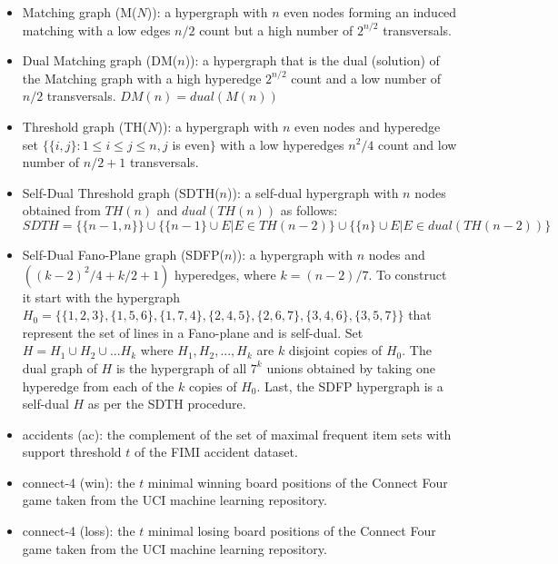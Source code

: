 \begin{itemize}
    \item Matching graph (M($N$)): a hypergraph with $n$ even nodes forming an induced matching with a low edges $n/2$ count but a high number of $2^{n/2}$ transversals.
    
     \scalebox{.75}{} 
     
    
    \item Dual Matching graph (DM($n$)): a hypergraph that is the dual (solution) of the Matching graph with a high hyperedge $2^{n/2}$ count and a low number of $n/2$ transversals. $DM(n) = dual(M(n))$
    
     \scalebox{.75}{}
    
    \item Threshold graph (TH($N$)): a hypergraph with $n$ even nodes and hyperedge set $\{\{i,j\}:1 \leq i \le j \leq n, j$ is even$\}$ with a low hyperedges ${n^2}/4$ count and low number of  $n/2 +1$ transversals.
    
     \scalebox{.75}{}   
    
    \item Self-Dual Threshold graph (SDTH($n$)): a self-dual hypergraph with $n$ nodes obtained from $TH(n)$ and $dual(TH(n))$ as follows: $$SDTH = \{ \{n-1,n\}\} \cup \{ \{n-1\} \cup E | E \in TH(n-2) \} \cup \{\{n\} \cup E|E\in dual(TH(n-2)) \} $$
    
      \scalebox{.75}{} 

    \item Self-Dual Fano-Plane graph (SDFP($n$)): a hypergraph with $n$ nodes and $((k-2)^2/4 + k/2 + 1)$ hyperedges, where $k = (n-2)/7$. To construct it start with the hypergraph $H_0=\{\{1,2,3\},\{1,5,6\},\{1,7,4\},\{2,4,5\},\{2,6,7\},\{3,4,6\},\{3,5,7\}\}$ that represent the set of lines in a Fano-plane and is self-dual. Set $H=H_1 \cup H_2 \cup ... H_k$ where $H_1,H_2,...,H_k$ are $k$ disjoint copies of $H_0$. The dual graph of $H$ is the hypergraph of all $7^k$ unions obtained by taking one hyperedge from each of the $k$ copies of $H_0$. Last, the SDFP hypergraph is a self-dual $H$ as per the SDTH procedure. 
    
     \scalebox{.75}{} 
    
    \item accidents (ac): the complement of the set of maximal frequent item sets with support threshold $t$ of the FIMI accident dataset.
    
     \scalebox{.75}{} 
    
    \item connect-4 (win): the $t$  minimal winning board positions of the Connect Four game taken from the UCI machine learning repository.
    
     \scalebox{.75}{} 
    
    \item connect-4 (loss): the $t$  minimal losing board positions of the Connect Four game  taken from the UCI machine learning repository.
    
     \scalebox{.75}{}
    
\end{itemize}

 

 
 
 